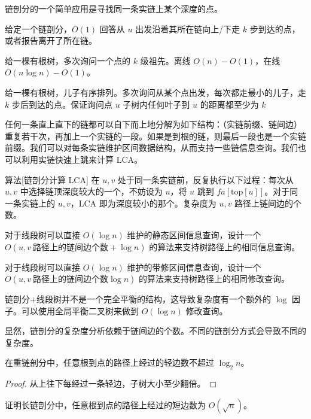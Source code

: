 链剖分的一个简单应用是寻找同一条实链上某个深度的点。
\begin{example}
    给定一个链剖分，$O(1)$ 回答从 $u$ 出发沿着其所在链向上/下走 $k$ 步到达的点，或者报告离开了所在链。
\end{example}
\begin{exercise}[$k$ 级祖先]
    给一棵有根树，多次询问一个点的 $k$ 级祖先。离线 $O(n)-O(1)$，在线 $O(n\log n)-O(1)$。
\end{exercise}
\begin{exercise}
    给一棵有根树，儿子有序排列。多次询问从某个点出发，每次都走最小的儿子，走 $k$ 步后到达的点。保证询问点 $u$ 子树内任何叶子到 $u$ 的距离都至少为 $k$
\end{exercise}


任何一条直上直下的链都可以自下而上地分解为如下结构：（实链前缀、链间边）重复若干次，再加上一个实链的一段。如果是到根的链，则最后一段也是一个实链前缀。我们可以对每条实链维护区间数据结构，从而支持一些链信息查询。我们也可以利用实链快速上跳来计算 LCA。

\begin{descbox}{算法}[链剖分计算 LCA]
    在 $u,v$ 处于同一条实链前，反复执行以下过程：每次从 $u,v$ 中选择链顶深度较大的一个，不妨设为 $u$，将 $u$ 跳到 $fa[\mathrm{top}[u]]$。对于同一条实链上的 $u,v$，LCA 即为深度较小的那个。复杂度为 $u,v$ 路径上链间边的个数。
\end{descbox}

\begin{exercise}
    对于线段树可以直接 $O(\log n)$ 维护的静态区间信息查询，设计一个 $O(u,v\ \text{路径上的链间边个数}+\log n)$ 的算法来支持树路径上的相同信息查询。
\end{exercise}
\begin{exercise}
    对于线段树可以直接 $O(\log n)$ 维护的带修区间信息查询，设计一个 $O(u,v\ \text{路径上的链间边个数}\log n)$ 的算法来支持树路径上的相同修改查询。
\end{exercise}
\begin{remark}
    链剖分+线段树并不是一个完全平衡的结构，这导致复杂度有一个额外的 $\log$ 因子。可以使用全局平衡二叉树来做到 $O(\log n)$ 修改查询。
\end{remark}

显然，链剖分的复杂度分析依赖于链间边的个数。不同的链剖分方式会导致不同的复杂度。

\begin{lemma}
    在重链剖分中，任意根到点的路径上经过的轻边数不超过 $\log_2 n$。
\end{lemma}
\begin{proof}
    从上往下每经过一条轻边，子树大小至少翻倍。
\end{proof}
\begin{exercise}
    证明长链剖分中，任意根到点的路径上经过的短边数为 $O(\sqrt{n})$。
\end{exercise}

